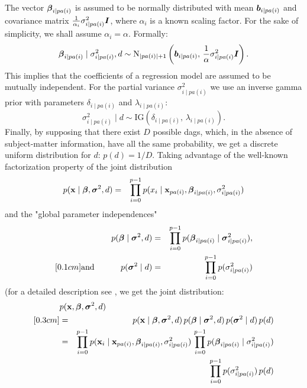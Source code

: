 The vector $\mbox{\boldmath $\beta$}_{i \mid pa(i)}$ is assumed to be normally
distributed with mean $\mbox{\boldmath $b$}_{i \mid pa(i)}$ and covariance matrix $
\frac{1}{\alpha_i} \sigma_{i \mid pa(i)}^2 \mbox{\boldmath $I$} $, where $\alpha_i$
is a known scaling factor. For the sake of simplicity, we shall
assume $\alpha_i=\alpha$. Formally:
%
$$\mbox{\boldmath $\beta$}_{i \mid pa(i)} \mid \sigma_{i \mid pa(i)}^2, d   \sim
\mbox{N}_{|pa(i)|+1} \left ( \mbox{\boldmath $b$}_{i \mid pa(i)}, \,\frac{1}{\alpha}
\sigma_{i \mid pa(i)}^2 \mbox{\boldmath $I$}  \right ).$$
%
This implies that the coefficients of a regression model are
assumed to be mutually independent. For the partial variance
$\sigma_{i \mid pa(i)}^2$ we use an inverse gamma prior with
parameters $\delta_{i \mid pa(i)}$ and $\lambda_{i \mid pa(i)}$:
%
$$\sigma_{i \mid pa(i)}^2 \mid  d \sim \mbox{IG} \left ( \delta_{i
\mid pa(i)}, \,\lambda_{i \mid pa(i)} \right).$$
%
Finally, by supposing that there exist $D$ possible dags, which,
in the absence of subject-matter information, have all the same
probability, we get a discrete uniform distribution for $d$: $p(d)
=  1/D.$ Taking advantage of the well-known factorization property
of the joint distribution
\begin{eqnarray}
p(\mathbf{x} \mid \mbox{\boldmath $\beta$}, \mbox{\boldmath $\sigma$}^2, d) &=&  \prod_{i=0}^{p-1} p(x_i \mid
\mathbf{x}_{pa(i)}, \mbox{\boldmath $\beta$}_{i \mid pa(i)}, \sigma_{i\mid pa(i)}^2)
\nonumber
\end{eqnarray}
and the "global parameter independences"
\begin{eqnarray}
p(\mbox{\boldmath $\beta$} \mid  \mbox{\boldmath $\sigma$}^2, d) &=& \prod_{i=0}^{p-1} p(\mbox{\boldmath $\beta$}_{i
\mid pa(i)} \mid \mbox{\boldmath $\sigma$}_{i \mid pa(i)}^2),  \nonumber \\ [0.1cm]
\mbox{and \hspace{1cm}} p( \mbox{\boldmath $\sigma$}^2 \mid d) &=& \prod_{i=0}^{p-1}
p(\sigma_{i \mid pa(i)}^2) \nonumber
\end{eqnarray}
(for a detailed description see , we
get the joint distribution:
%
\begin{eqnarray}
\lefteqn{ p(\xvec, \mbeta, \msigma^2, d)  }  \nonumber \\  [0.3cm]
&=&   p(\xvec \mid \mbeta, \msigma^2, d) \,p(\mbeta \mid \msigma^2, d)  \, p( \msigma^2 \mid d)  \, p(d) \nonumber\\
&=&    \prod_{i=0}^{p-1} p( \xvec_i \mid \xvec_{pa(i)}, \mbeta_{i \mid
pa(i)}, \sigma^2_{i \mid pa(i)})
    \, \prod_{i=0}^{p-1} p(\mbeta_{i \mid pa(i)} \mid \sigma_{i \mid pa(i)}^2)  \nonumber  \\
& &  \, \prod_{i=0}^{p-1} p(\sigma_{i \mid pa(i)}^2) \, p(d)
\nonumber
\end{eqnarray}

